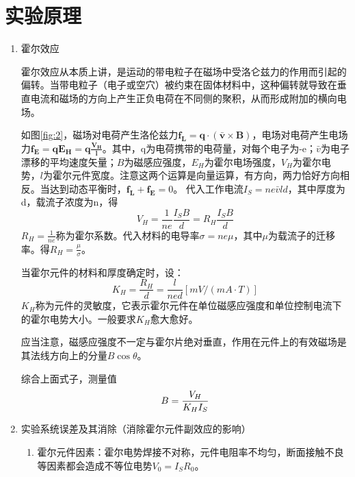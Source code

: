 \documentclass[11pt]{article}
\begin{document}
\section{实验原理}
\begin{enumerate}
    \item 霍尔效应
    \par \hspace*{2em}霍尔效应从本质上讲，是运动的带电粒子在磁场中受洛仑兹力的作用而引起的偏转。当带电粒子（电子或空穴）被约束在固体材料中，这种偏转就导致在垂直电流和磁场的方向上产生正负电荷在不同侧的聚积，从而形成附加的横向电场。
    \par \hspace*{2em}如图\cref{fig:2}，磁场对电荷产生洛伦兹力$\mathbf{f_L=q\cdot(\bar{v}\times B)}$，电场对电荷产生电场力$\mathbf{f_E=qE_H=q\frac{V_H}{l}}$。其中，q为电荷携带的电荷量，对每个电子为-e；$\bar{v}$为电子漂移的平均速度矢量；$B$为磁感应强度，$E_H$为霍尔电场强度，$V_H$为霍尔电势，$l$为霍尔元件宽度。注意这两个运算是向量运算，有方向，两力恰好方向相反。当达到动态平衡时，$\mathbf{f_L+f_E}=0$。
    代入工作电流$I_S=ne\bar{v}ld$，其中厚度为d，载流子浓度为n，得
    \begin{equation}
        V_H=\frac{1}{ne}\frac{I_SB}{d}=R_H\frac{I_SB}{d}
    \end{equation}
    $R_H=\frac{1}{ne}$称为霍尔系数。代入材料的电导率$\sigma=ne\mu$，其中$\mu$为载流子的迁移率。得$R_H=\frac{\mu}{\sigma}$。
    \par \hspace*{2em}当霍尔元件的材料和厚度确定时，设：
    \begin{equation}
        K_H=\frac{R_H}{d}=\frac{l}{ned}\left[mV/(mA\cdot T)\right]
    \end{equation}
    $K_H$称为元件的灵敏度，它表示霍尔元件在单位磁感应强度和单位控制电流下的霍尔电势大小。一般要求$K_H$愈大愈好。
    \par \hspace*{2em}应当注意，磁感应强度不一定与霍尔片绝对垂直，作用在元件上的有效磁场是其法线方向上的分量$B\cos \theta$。
    \par \hspace*{2em}综合上面式子，测量值
    \begin{equation}{\label{equ:2.5}}
        B=\frac{V_H}{K_HI_S}
    \end{equation}
    \item 实验系统误差及其消除（消除霍尔元件副效应的影响）
    \begin{enumerate}
        \item 霍尔元件因素：霍尔电势焊接不对称，元件电阻率不均匀，断面接触不良等因素都会造成不等位电势$V_0=I_SR_0$。

\end{enumerate}
\end{enumerate}
\end{document}
